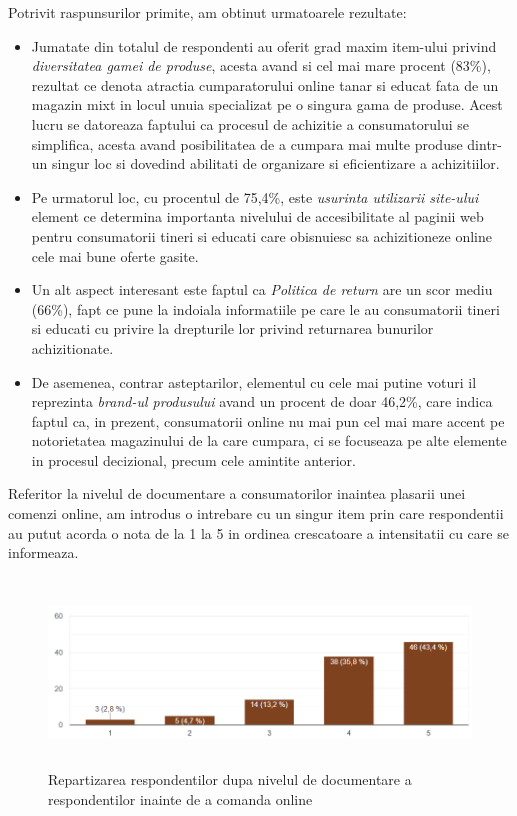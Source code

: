 \documentclass[a4paper, 12pt]{article}
\begin{document}
\begin{enumerate}[(A)]
\begin{center}
		\end{center}
		\qquad Potrivit raspunsurilor primite, am obtinut urmatoarele rezultate:
		\begin{itemize}
			\item Jumatate din totalul de respondenti au oferit grad maxim item-ului privind \textit{diversitatea gamei de produse}, acesta avand si cel mai mare procent (83\%), rezultat ce denota atractia cumparatorului online tanar si educat fata de un magazin mixt  in locul unuia specializat pe o singura gama de produse. Acest lucru se datoreaza faptului ca procesul de achizitie a consumatorului se simplifica, acesta avand posibilitatea de a cumpara mai multe produse dintr-un singur loc si dovedind abilitati de organizare si eficientizare a achizitiilor.
			\item Pe urmatorul loc, cu procentul de 75,4\%, este \textit{usurinta utilizarii site-ului} element ce determina importanta nivelului de accesibilitate al paginii web pentru consumatorii tineri si educati care obisnuiesc sa achizitioneze online cele mai bune oferte gasite.
			\item Un alt aspect interesant este faptul ca \textit{Politica de return }are un scor mediu (66\%), fapt ce pune la indoiala informatiile pe care le au consumatorii tineri si educati cu privire la drepturile lor privind returnarea bunurilor achizitionate. 
			\item De asemenea, contrar asteptarilor, elementul cu cele mai putine voturi il reprezinta \textit{brand-ul produsului} avand un procent de doar 46,2\%, care indica faptul ca, in prezent, consumatorii online nu mai pun cel mai mare accent pe notorietatea  magazinului de la care cumpara, ci se focuseaza pe alte elemente in procesul decizional, precum cele amintite anterior.
		\end{itemize}
		
		\quad Referitor la nivelul de documentare a consumatorilor inaintea plasarii unei comenzi online, am introdus o intrebare cu un singur item prin care respondentii au putut acorda o nota de la 1 la 5 in ordinea crescatoare a intensitatii cu care se informeaza.
		
		\begin{figure}[!htb]
			\centering
			\includegraphics[width=14cm, height=5cm]{"figures/trei.png"}
			\caption{ Repartizarea respondentilor dupa nivelul de documentare a respondentilor inainte de a comanda online}\label{fig:unuspre}
		\end{figure}
	

\end{enumerate}
\end{document}
